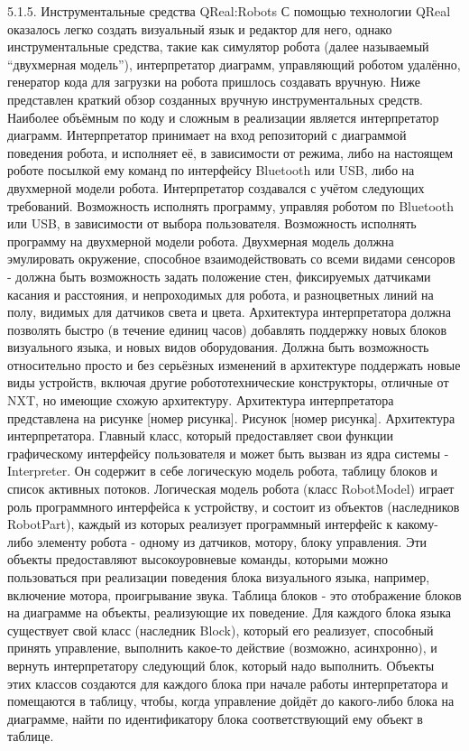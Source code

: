 5.1.5. Инструментальные средства QReal:Robots
	С помощью технологии QReal оказалось легко создать визуальный язык и редактор для него, однако инструментальные средства, такие как симулятор робота (далее называемый “двухмерная модель”), интерпретатор диаграмм, управляющий роботом удалённо, генератор кода для загрузки на робота пришлось создавать вручную. Ниже представлен краткий обзор созданных вручную инструментальных средств.
	Наиболее объёмным по коду и сложным в реализации является интерпретатор диаграмм. Интерпретатор принимает на вход репозиторий с диаграммой поведения робота, и исполняет её, в зависимости от режима, либо на настоящем роботе посылкой ему команд по интерфейсу Bluetooth или USB, либо на двухмерной модели робота. Интерпретатор создавался с учётом следующих требований.
Возможность исполнять программу, управляя роботом по Bluetooth или USB, в зависимости от выбора пользователя.
Возможность исполнять программу на двухмерной модели робота. Двухмерная модель должна эмулировать окружение, способное взаимодействовать со всеми видами сенсоров - должна быть возможность задать положение стен, фиксируемых датчиками касания и расстояния, и непроходимых для робота, и разноцветных линий на полу, видимых для датчиков света и цвета.
Архитектура интерпретатора должна позволять быстро (в течение единиц часов) добавлять поддержку новых блоков визуального языка, и новых видов оборудования. Должна быть возможность относительно просто и без серьёзных изменений в архитектуре поддержать новые виды устройств, включая другие робототехнические конструкторы, отличные от NXT, но имеющие схожую архитектуру.
	Архитектура интерпретатора представлена на рисунке [номер рисунка]. 
Рисунок [номер рисунка]. Архитектура интерпретатора.
	Главный класс, который предоставляет свои функции графическому интерфейсу пользователя и может быть вызван из ядра системы - Interpreter. Он содержит в себе логическую модель робота, таблицу блоков и список активных потоков. Логическая модель робота (класс RobotModel) играет роль программного интерфейса к устройству, и состоит из объектов (наследников RobotPart), каждый из которых реализует программный интерфейс к какому-либо элементу робота - одному из датчиков, мотору, блоку управления. Эти объекты предоставляют высокоуровневые команды, которыми можно пользоваться при реализации поведения блока визуального языка, например, включение мотора, проигрывание звука. Таблица блоков - это отображение блоков на диаграмме на объекты, реализующие их поведение. Для каждого блока языка существует свой класс (наследник Block), который его реализует, способный принять управление, выполнить какое-то действие (возможно, асинхронно), и вернуть интерпретатору следующий блок, который надо выполнить. Объекты этих классов создаются для каждого блока при начале работы интерпретатора и помещаются в таблицу, чтобы, когда управление дойдёт до какого-либо блока на диаграмме, найти по идентификатору блока соответствующий ему объект в таблице.

